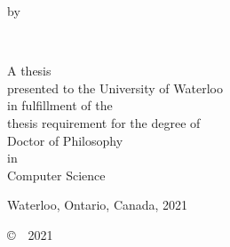 \thispagestyle{empty}
\begin{center}
	\sffamily
	\vfill
	\Huge
	\thetitle
	
	\vfill
	
	\normalsize
	by \\
	
	\vfill
	
	\Large
	\theauthor \\
	
	\vfill
	\vfill
	\vfill
	
	\normalsize
	A thesis \\
	presented to the University of Waterloo \\ 
	in fulfillment of the \\
	thesis requirement for the degree of \\
	Doctor of Philosophy \\
	in \\
	Computer Science \\
	
	\vfill
	\vfill

	Waterloo, Ontario, Canada, 2021 \\
	
	\vfill
	
	\copyright\ \theauthor~2021 \\
\end{center}
\clearpage